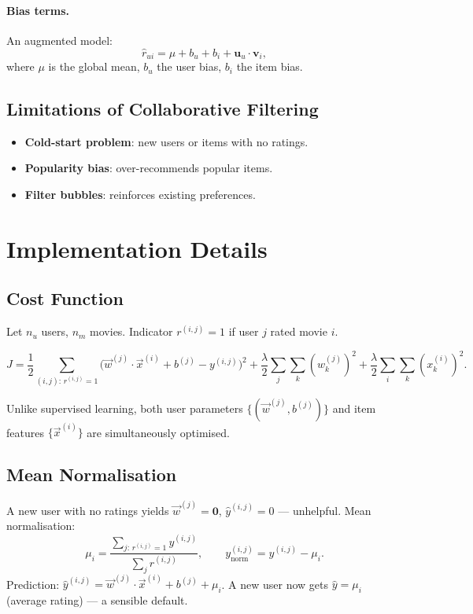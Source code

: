 \paragraph{Bias terms.} An augmented model:
\[\hat{r}_{ui}=\mu+b_u+b_i+\mathbf{u}_u\cdot\mathbf{v}_i,\]
where $\mu$ is the global mean, $b_u$ the user bias, $b_i$ the item bias.

\subsection{Limitations of Collaborative Filtering}

\begin{itemize}
\item \textbf{Cold-start problem}: new users or items with no ratings.
\item \textbf{Popularity bias}: over-recommends popular items.
\item \textbf{Filter bubbles}: reinforces existing preferences.
\end{itemize}

\section{Implementation Details}

\subsection{Cost Function}

Let $n_u$ users, $n_m$ movies. Indicator $r^{(i,j)}=1$ if user $j$ rated
movie $i$.

\begin{equation}
J=\frac{1}{2}\sum_{(i,j):\,r^{(i,j)}=1}
\!\!\bigl(\vec{w}^{(j)}\cdot\vec{x}^{(i)}+b^{(j)}-y^{(i,j)}\bigr)^2
+\frac{\lambda}{2}\sum_j\sum_k(w_k^{(j)})^2
+\frac{\lambda}{2}\sum_i\sum_k(x_k^{(i)})^2.
\label{eq:rec-cost}
\end{equation}

Unlike supervised learning, both user parameters $\{(\vec{w}^{(j)},b^{(j)})\}$
and item features $\{\vec{x}^{(i)}\}$ are simultaneously optimised.

\subsection{Mean Normalisation}

A new user with no ratings yields $\vec{w}^{(j)}=\mathbf{0}$,
$\hat{y}^{(i,j)}=0$ --- unhelpful. Mean normalisation:
\[\mu_i=\frac{\sum_{j:\,r^{(i,j)}=1}y^{(i,j)}}{\sum_j r^{(i,j)}},\qquad
y_{\text{norm}}^{(i,j)}=y^{(i,j)}-\mu_i.\]
Prediction: $\hat{y}^{(i,j)}=\vec{w}^{(j)}\cdot\vec{x}^{(i)}+b^{(j)}+\mu_i$.
A new user now gets $\hat{y}=\mu_i$ (average rating) --- a sensible default.


